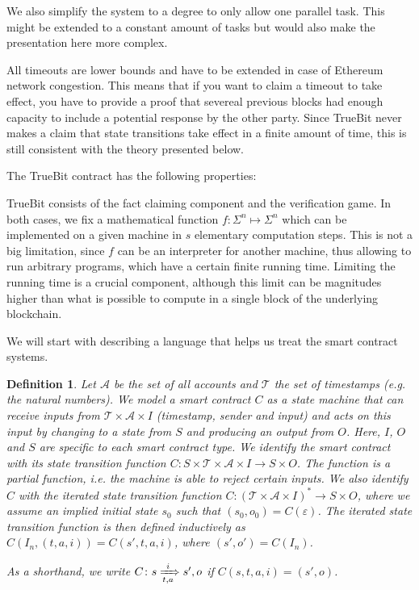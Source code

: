\documentclass[11pt,letterpaper]{article}
\newtheorem{definition}[dummytheorem]{Definition}
\begin{document}
We also simplify the system to a degree to only allow one parallel task. This might be extended to a constant amount
of tasks but would also make the presentation here more complex.

All timeouts are lower bounds and have to be extended in case of Ethereum network congestion. This means that if you want
to claim a timeout to take effect, you have to provide a proof that severeal previous blocks had enough capacity to
include a potential response by the other party. Since TrueBit never makes a claim that state transitions take effect
in a finite amount of time, this is still consistent with the theory presented below.

The TrueBit contract has the following properties:

TrueBit consists of the fact claiming component and the verification game. In both cases, we fix a mathematical function
$f \colon \Sigma^n \mapsto \Sigma^n$ which can be implemented on a given machine in $s$ elementary computation steps.
This is not a big limitation, since $f$ can be an interpreter for another machine, thus allowing to run arbitrary programs,
which have a certain finite running time. Limiting the running time is a crucial component, although this limit can be
magnitudes higher than what is possible to compute in a single block of the underlying blockchain.

We will start with describing a language that helps us treat the smart contract systems.

\begin{definition}
Let $\mathcal{A}$ be the set of all accounts and $\mathcal{T}$ the set of timestamps (e.g. the natural numbers).
We model a smart contract $C$ as a state machine that can receive inputs from $\mathcal{T} \times \mathcal{A} \times I$
(timestamp, sender and input)
and acts on this input by changing to a state from $S$ and producing an output from $O$. Here, $I$, $O$ and $S$
are specific to each smart contract type. We identify the smart contract with its state transition function
$C \colon S \times \mathcal{T} \times \mathcal{A} \times I \to S \times O$. The function is a partial function, i.e.
the machine is able to reject certain inputs. We also identify $C$ with the
iterated state transition function $C \colon (\mathcal{T} \times \mathcal{A} \times I)^* \to S \times O$,
where we assume an implied initial state $s_0$ such that $(s_0, o_0) = C(\varepsilon)$. The iterated state
transition function is then defined inductively as
$C(I_n, (t, a, i)) = C(s', t, a, i)$, where $(s', o') = C(I_n)$.

As a shorthand, we write $C\colon s \xRightarrow[t, a]{i} s', o$ if $C(s, t, a, i) = (s', o)$.
\end{definition}
\end{document}
